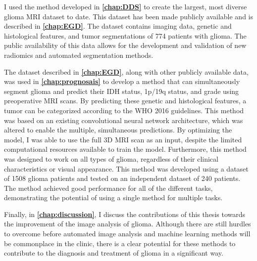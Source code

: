 I used the method developed in \textbf{\cref{chap:DDS}} to create the largest, most diverse glioma \gls{MRI} dataset to date.
This dataset has been made publicly available and is described in \textbf{\cref{chap:EGD}}.
The dataset contains imaging data, genetic and histological features, and \gls{tumor} segmentations of 774 patients with glioma.
The public availability of this data allows for the development and validation of new radiomics and automated segmentation methods.

The dataset described in \textbf{\cref{chap:EGD}}, along with other publicly available data, was used in \textbf{\cref{chap:prognosais}} to develop a method that can simultaneously segment glioma and predict their \gls{IDH} status, 1p/19q status, and grade using preoperative \gls{MRI} scans.
By predicting these genetic and histological features, a \gls{tumor} can be categorized according to the \gls{WHO} 2016 guidelines.
This method was based on an existing convolutional neural network architecture, which was altered to enable the multiple, simultaneous predictions.
By optimizing the model, I was able to use the full 3D \gls{MRI} scan as an input, despite the limited computational resources available to train the model.
Furthermore, this method was designed to work on all types of glioma, regardless of their clinical characteristics or visual appearance.
This method was developed using a dataset of \num{1508} glioma patients and tested on an independent dataset of \num{240} patients.
The method achieved good performance for all of the different tasks, demonstrating the potential of using a single method for multiple tasks.

Finally, in \textbf{\cref{chap:discussion}}, I discuss the contributions of this thesis towards the improvement of the image analysis of glioma.
Although there are still hurdles to overcome before automated image analysis and machine learning methods will be commonplace in the clinic, there is a clear potential for these methods to contribute to the diagnosis and treatment of glioma in a significant way.
